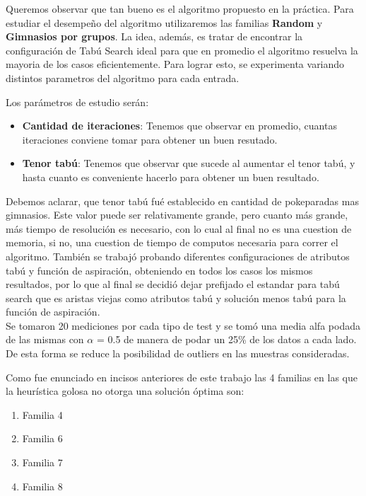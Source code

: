 Queremos observar que tan bueno es el algoritmo propuesto en la práctica.
Para estudiar el desempeño del algoritmo utilizaremos las familias \textbf{Random} y \textbf{Gimnasios por grupos}. 
La idea, además, es tratar de encontrar la configuración de Tabú Search ideal para que en promedio el algoritmo resuelva la mayoria de los casos eficientemente. Para lograr esto, se experimenta variando distintos parametros del algoritmo para cada entrada.

Los parámetros de estudio serán:

\begin{itemize}
\item  \textbf{Cantidad de iteraciones}: Tenemos que observar en promedio, cuantas iteraciones conviene tomar para obtener un buen resutado.
\item \textbf{Tenor tabú}: Tenemos que observar que sucede al aumentar el tenor tabú, y hasta cuanto es conveniente hacerlo para obtener un buen resultado.
\end{itemize}

Debemos aclarar, que tenor tabú fué establecido en cantidad de pokeparadas mas gimnasios. Este valor puede ser relativamente grande, pero cuanto más grande, más tiempo de resolución es necesario, con lo cual al final no es una cuestion de memoria, si no, una cuestion de tiempo de computos necesaria para correr el algoritmo.
También se trabajó probando diferentes configuraciones de atributos tabú y función de aspiración, obteniendo en todos los casos los mismos resultados, por lo que al final se decidió dejar prefijado el estandar para tabú search que es aristas viejas como atributos tabú y solución menos tabú para la función de aspiración.\\

Se tomaron 20 mediciones por cada tipo de test y se tomó una media alfa podada de las mismas con $\alpha$ = 0.5 de manera de podar un 25\% de los datos a cada lado.  De esta forma se reduce la posibilidad de outliers en las muestras consideradas.

Como fue enunciado en incisos anteriores de este trabajo las 4 familias en las que la heur\'istica golosa no otorga una soluci\'on \'optima son:

\begin{enumerate}
\item Familia 4
\item Familia 6
\item Familia 7
\item Familia 8
\end{enumerate}

